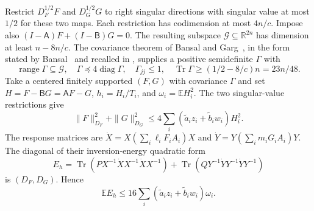 Restrict $D_F^{1/2}F$ and $D_G^{1/2}G$ to right singular directions
with singular value at most $1/2$ for these two maps.  Each restriction
has codimension at most $4n/c$.  Impose also
$(I-\mathsf A)F+(I-\mathsf B)G=0$.  The resulting subspace
$\mathcal G\subseteq\mathbb R^{2n}$ has dimension at least $n-8n/c$.
The covariance theorem of Bansal and Garg~\cite[Theorem~6]{BansalGarg2017},
in the form stated by Bansal~\cite[Theorem~2.5]{Bansal2024} and recalled
in \cite[Lemma~2.1]{EzeunalaJiang2026}, supplies a
positive semidefinite $\Gamma$ with
\[
 \operatorname{range}\Gamma\subseteq\mathcal G,\quad
 \Gamma\preceq4\operatorname{diag}\Gamma,\quad
 \Gamma_{jj}\le1,\quad
 \operatorname{Tr}\Gamma\ge(1/2-8/c)n=23n/48.
\]
Take a centered finitely supported $(F,G)$ with covariance $\Gamma$
and set $H=F-\mathsf BG=\mathsf AF-G$, $h_i=H_i/T_i$, and
$\omega_i=\mathbb E H_i^2$.
The two singular-value restrictions give
\[
 \|F\|_{D_F}^2+\|G\|_{D_G}^2
 \le4\sum_i(\widetilde a_i z_i+\widetilde b_i w_i)H_i^2.
\]
The response matrices are
$\dot X=X(\sum_i\ell_iF_iA_i)X$ and
$\dot Y=Y(\sum_i m_iG_iA_i)Y$.
The diagonal of their inversion-energy quadratic form
\[
 E_h=\operatorname{Tr}(PX^{-1}\dot X X^{-1}\dot X X^{-1})
     +\operatorname{Tr}(QY^{-1}\dot Y Y^{-1}\dot Y Y^{-1})
\]
is $(D_F,D_G)$.  Hence
\begin{equation}
 \mathbb E E_h\le16\sum_i
          (\widetilde a_i z_i+\widetilde b_i w_i)\omega_i.
 \label{eq:sign-energy}
\end{equation}

